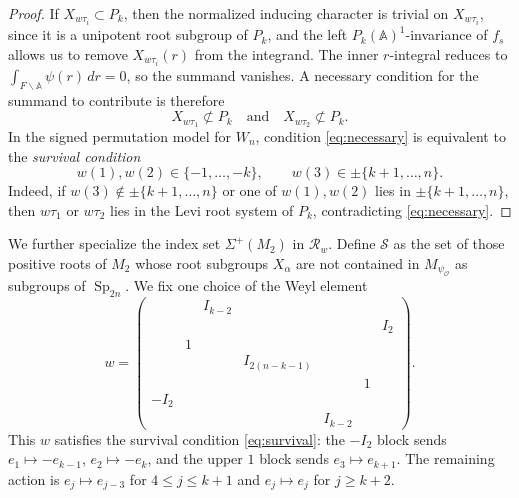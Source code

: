 \documentclass[11pt,notitlepage]{amsart}
\theoremstyle{definition}
\theoremstyle{remark}
\newcommand{\calO}{\mathcal{O}}
\newcommand{\calR}{\mathcal{R}}
\newcommand{\calS}{\mathcal{S}}
\newcommand{\bbA}{\mathbb{A}}
\DeclareMathOperator{\Sp}{Sp}
\begin{document}
\begin{proof}
If \(X_{w\tau_i}\subset P_k\), then the normalized inducing
character is trivial on \(X_{w\tau_i}\), since it is a unipotent
root subgroup of \(P_k\), and the left $P_k(\bbA)^1$-invariance of $f_s$ allows us to remove $X_{w \tau_i}(r)$ from the integrand. The inner $r$-integral reduces to $\int_{F \backslash \bbA} \psi(r)\, dr = 0$, so the summand vanishes. A necessary condition for the summand to contribute is therefore
\begin{equation}\label{eq:necessary}
    X_{w \tau_1} \not\subset P_k \quad \text{and} \quad X_{w \tau_2} \not\subset P_k.
\end{equation}
In the signed permutation model for $W_n$, condition \eqref{eq:necessary} is equivalent to the \emph{survival condition}
\begin{equation}\label{eq:survival}
    w(1), w(2) \in \{-1, \ldots, -k\}, \qquad w(3) \in \pm\{k+1, \ldots, n\}.
\end{equation}
Indeed, if $w(3) \notin \pm\{k+1, \ldots, n\}$ or one of $w(1), w(2)$ lies in $\pm\{k+1, \ldots, n\}$, then $w \tau_1$ or $w \tau_2$ lies in the Levi root system of $P_k$, contradicting \eqref{eq:necessary}.
\end{proof}

We further specialize the index set $\Sigma^+(M_2)$ in $\calR_w$. Define $\calS$ as the set of those positive roots of $M_2$ whose root subgroups $X_\alpha$ are not contained in $M_{\psi_\calO}$ as subgroups of $\Sp_{2n}$. We fix one choice of the Weyl element
\begin{equation}\label{choiceofw}
    w = \begin{pmatrix}
        & & I_{k-2} & & & & \\
        & & & & & & I_{2} \\
        & 1 & & & & & \\
        & & & I_{2(n-k-1)} & & & \\
        & & & & & 1 & \\
        -I_{2} & & & & & & \\
        & & & & I_{k-2} & &
    \end{pmatrix}.
\end{equation}
This $w$ satisfies the survival condition \eqref{eq:survival}: the $-I_2$ block sends $e_1 \mapsto -e_{k-1}$, $e_2 \mapsto -e_k$, and the upper $1$ block sends $e_3 \mapsto e_{k+1}$. The remaining action is $e_j \mapsto e_{j-3}$ for $4 \leq j \leq k+1$ and $e_j \mapsto e_j$ for $j \geq k+2$.
\end{document}
